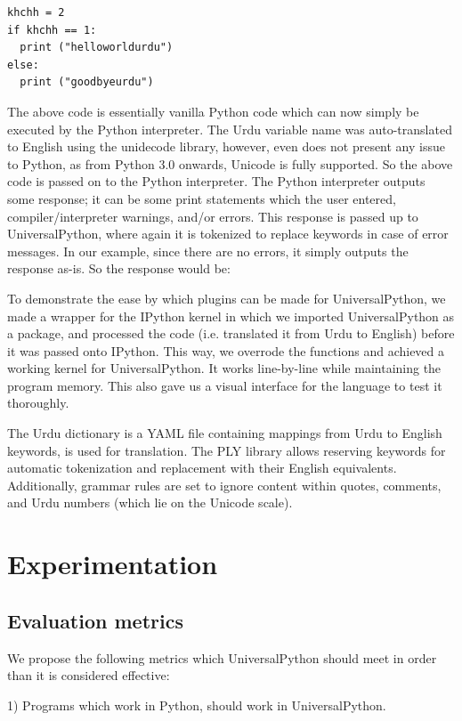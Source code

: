 \documentclass[conference]{IEEEtran}
\begin{document}
\begin{lstlisting}
khchh = 2
if khchh == 1:
  print ("helloworldurdu")
else:
  print ("goodbyeurdu")
\end{lstlisting}

The above code is essentially vanilla Python code which can now simply be executed by the Python interpreter. The Urdu variable name was auto-translated to English using the unidecode library, however, even  does not present any issue to Python, as from Python 3.0 onwards, Unicode is fully supported. So the above code is passed on to the Python interpreter. The Python interpreter outputs some response; it can be some print statements which the user entered, compiler/interpreter warnings, and/or errors. This response is passed up to UniversalPython, where again it is tokenized to replace keywords in case of error messages. In our example, since there are no errors, it simply outputs the response as-is. So the response would be:

To demonstrate the ease by which plugins can be made for UniversalPython, we made a wrapper for the IPython kernel in which we imported UniversalPython as a package, and processed the code (i.e. translated it from Urdu to English) before it was passed onto IPython. This way, we overrode the functions and achieved a working kernel for UniversalPython. It works line-by-line while maintaining the program memory. This also gave us a visual interface for the language to test it thoroughly.

The Urdu dictionary is a YAML file containing mappings from Urdu to English keywords, is used for translation. The PLY library allows reserving keywords for automatic tokenization and replacement with their English equivalents. Additionally, grammar rules are set to ignore content within quotes, comments, and Urdu numbers (which lie on the Unicode scale).

\section{Experimentation}

\subsection{Evaluation metrics}\label{AA}

We propose the following metrics which UniversalPython should meet in order than it is considered effective:

1) Programs which work in Python, should work in UniversalPython.
\end{document}
